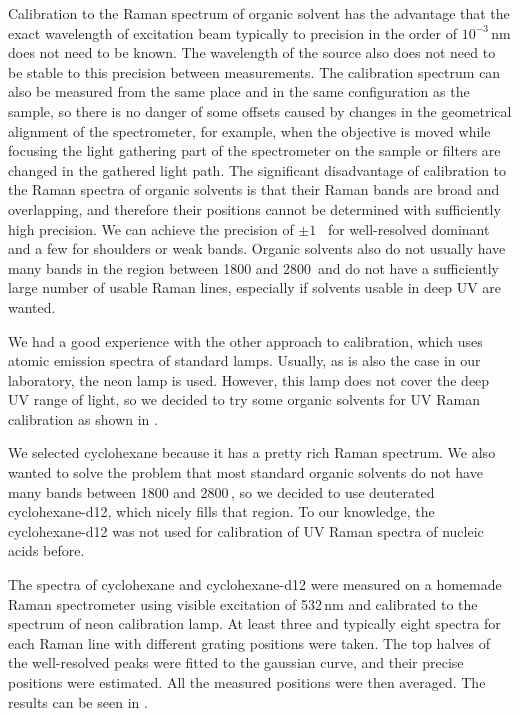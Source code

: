 %

Calibration to the Raman spectrum of organic solvent has the advantage that the
exact wavelength of excitation beam typically to precision in the order of
$10^{-3}$\,nm does not need to be known.
The wavelength of the source also does not need to be stable to this precision
between measurements.
The calibration spectrum can also be measured from the same place and in the
same configuration as the sample, so there is no danger of some offsets caused
by changes in the geometrical alignment of the spectrometer, for example, when
the objective is moved while focusing the light gathering part of the
spectrometer on the sample or filters are changed in the gathered light path.
The significant disadvantage of calibration to the Raman spectra of organic
solvents is that their Raman bands are broad and overlapping, and therefore
their positions cannot be determined with sufficiently high precision.
We can achieve the precision of $\pm1$ \,\icm{} for well-resolved dominant and
a few \icm{} for shoulders or weak bands.
Organic solvents also do not usually have many bands in the region between
1800 and 2800\,\icm{} and do not have a sufficiently large number of usable
Raman lines, especially if solvents usable in deep UV are wanted.

We had a good experience with the other approach to calibration, which uses
atomic emission spectra of standard lamps.
Usually, as is also the case in our laboratory, the neon lamp is used.
However, this lamp does not cover the deep UV range of light, so we decided to
try some organic solvents for UV Raman calibration as shown in
.

We selected cyclohexane because it has a pretty rich Raman spectrum.
We also wanted to solve the problem that most standard organic solvents do not
have many bands between 1800 and 2800\,\icm{}, so we decided to use deuterated
cyclohexane-d12, which nicely fills that region.
To our knowledge, the cyclohexane-d12 was not used for calibration of UV Raman
spectra of nucleic acids before.

The spectra of cyclohexane and cyclohexane-d12 were measured on a homemade
Raman spectrometer using visible excitation of 532\,nm
\parencite{Palacky2011}
and calibrated to the spectrum of neon calibration lamp. At least three and
typically eight spectra for each Raman line with different grating positions
were taken.
The top halves of the well-resolved peaks were fitted to the gaussian
curve, and their precise positions were estimated.
All the measured positions were then averaged.
The results can be seen in
.

